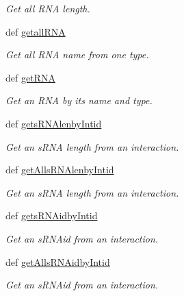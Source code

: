 \begin{DoxyCompactItemize}
\begin{DoxyCompactList}\small\item\em \-Get all \-R\-N\-A length. \end{DoxyCompactList}\item 
def \hyperlink{classirna_1_1iRNA__pred_1_1Sqlite__manager_1_1Sqlite__manager_a17a8ea894e0504f561ea4e60d658c047}{getall\-R\-N\-A}
\begin{DoxyCompactList}\small\item\em \-Get all \-R\-N\-A name from one type. \end{DoxyCompactList}\item 
def \hyperlink{classirna_1_1iRNA__pred_1_1Sqlite__manager_1_1Sqlite__manager_add58966c3f2add065d7d586153a55e5f}{get\-R\-N\-A}
\begin{DoxyCompactList}\small\item\em \-Get an \-R\-N\-A by its name and type. \end{DoxyCompactList}\item 
def \hyperlink{classirna_1_1iRNA__pred_1_1Sqlite__manager_1_1Sqlite__manager_af68a2718981b5e1efd9daab3e0a509f6}{gets\-R\-N\-Alenby\-Intid}
\begin{DoxyCompactList}\small\item\em \-Get an s\-R\-N\-A length from an interaction. \end{DoxyCompactList}\item 
def \hyperlink{classirna_1_1iRNA__pred_1_1Sqlite__manager_1_1Sqlite__manager_aed7105da89f02d8dcddd2a2faa5e276f}{get\-Alls\-R\-N\-Alenby\-Intid}
\begin{DoxyCompactList}\small\item\em \-Get an s\-R\-N\-A length from an interaction. \end{DoxyCompactList}\item 
def \hyperlink{classirna_1_1iRNA__pred_1_1Sqlite__manager_1_1Sqlite__manager_a72b35aa253f17047b8dddf3d7fcb5843}{gets\-R\-N\-Aidby\-Intid}
\begin{DoxyCompactList}\small\item\em \-Get an s\-R\-N\-Aid from an interaction. \end{DoxyCompactList}\item 
def \hyperlink{classirna_1_1iRNA__pred_1_1Sqlite__manager_1_1Sqlite__manager_a9b654f967762afb4523faec2bc46ecd5}{get\-Alls\-R\-N\-Aidby\-Intid}
\begin{DoxyCompactList}\small\item\em \-Get an s\-R\-N\-Aid from an interaction. \end{DoxyCompactList}\item 

\end{DoxyCompactItemize}
